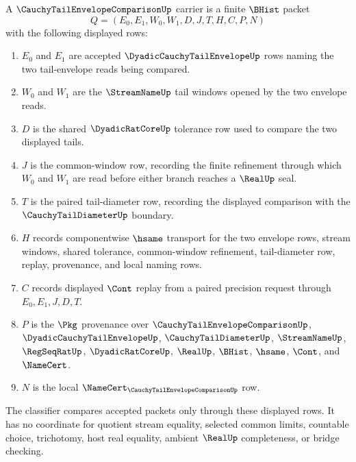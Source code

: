 \begin{definition}
\label{def:cauchy-tail-envelope-comparison-carrier}
A $\CauchyTailEnvelopeComparisonUp$ carrier is a finite $\BHist$ packet
$$
Q=(E_0,E_1,W_0,W_1,D,J,T,H,C,P,N)
$$
with the following displayed rows:
\begin{enumerate}
\item $E_0$ and $E_1$ are accepted $\DyadicCauchyTailEnvelopeUp$ rows naming the two tail-envelope reads being compared.
\item $W_0$ and $W_1$ are the $\StreamNameUp$ tail windows opened by the two envelope reads.
\item $D$ is the shared $\DyadicRatCoreUp$ tolerance row used to compare the two displayed tails.
\item $J$ is the common-window row, recording the finite refinement through which $W_0$ and $W_1$ are read before either branch reaches a $\RealUp$ seal.
\item $T$ is the paired tail-diameter row, recording the displayed comparison with the $\CauchyTailDiameterUp$ boundary.
\item $H$ records componentwise $\hsame$ transport for the two envelope rows, stream windows, shared tolerance, common-window refinement, tail-diameter row, replay, provenance, and local naming rows.
\item $C$ records displayed $\Cont$ replay from a paired precision request through $E_0,E_1,J,D,T$.
\item $P$ is the $\Pkg$ provenance over $\CauchyTailEnvelopeComparisonUp$, $\DyadicCauchyTailEnvelopeUp$, $\CauchyTailDiameterUp$, $\StreamNameUp$, $\RegSeqRatUp$, $\DyadicRatCoreUp$, $\RealUp$, $\BHist$, $\hsame$, $\Cont$, and $\NameCert$.
\item $N$ is the local $\NameCert_{\CauchyTailEnvelopeComparisonUp}$ row.
\end{enumerate}
The classifier compares accepted packets only through these displayed rows. It has no coordinate for quotient stream equality, selected common limits, countable choice, trichotomy, host real equality, ambient $\RealUp$ completeness, or bridge checking.
\end{definition}

